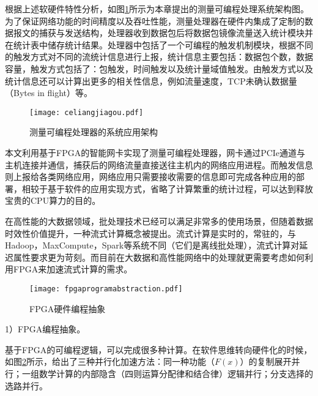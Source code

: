 \label{chapceliangjiagou}



根据上述软硬件特性分析，如图\ref{celiangjiagou}所示为本章提出的测量可编程处理系统架构图。为了保证网络功能的时间精度以及吞吐性能，测量处理器在硬件内集成了定制的数据报文的捕获与发送结构，处理器收到数据包后将数据包镜像流量送入统计模块并在统计表中储存统计结果。处理器中包括了一个可编程的触发机制模块，根据不同的触发方式对不同的流统计信息进行上报，统计信息主要包括：数据包个数，数据容量，触发方式包括了：包触发，时间触发以及统计量域值触发。由触发方式以及统计信息还可以计算出更多的相关性信息，例如流量速度，TCP未确认数据量（Bytes in flight）等。

\begin{figure}[!ht]
	\centering 
	\vspace{-1.5mm}
	\texttt{[image: celiangjiagou.pdf]}
	\caption{测量可编程处理器的系统应用架构} \label{celiangjiagou}
\end{figure}

本文利用基于FPGA的智能网卡实现了测量可编程处理器，网卡通过PCIe通道与主机连接并通信，捕获后的网络流量直接送往主机内的网络应用进程。而触发信息则上报给各类网络应用，网络应用只需要接收需要的信息即可完成各种应用的部署，相较于基于软件的应用实现方式，省略了计算繁重的统计过程，可以达到释放宝贵的CPU算力的目的。

\label{chap332}

在高性能的大数据领域，批处理技术已经可以满足非常多的使用场景，但随着数据时效性价值提升，一种流式计算概念被提出。流式计算是实时的，常驻的，与Hadoop，MaxCompute，Spark等系统不同（它们是离线批处理），流式计算对延迟属性要求更为苛刻。而目前在大数据和高性能网络中的处理就更需要考虑如何利用FPGA来加速流式计算的需求。

\begin{figure}[!ht]
	\centering 
	\vspace{-1.5mm}
	\texttt{[image: fpgaprogramabstraction.pdf]}
	\caption{FPGA硬件编程抽象} \label{fig:fpgaprogramabstraction}
\end{figure}

1）FPGA编程抽象。
		
基于FPGA的可编程逻辑，可以完成很多种计算。在软件思维转向硬件化的时候，如图\ref{fig:fpgaprogramabstraction}所示，给出了三种并行化加速方法：同一种功能（$F(x)$）的复制展开并行；一组数学计算的内部隐含（四则运算分配律和结合律）逻辑并行；分支选择的选路并行。



